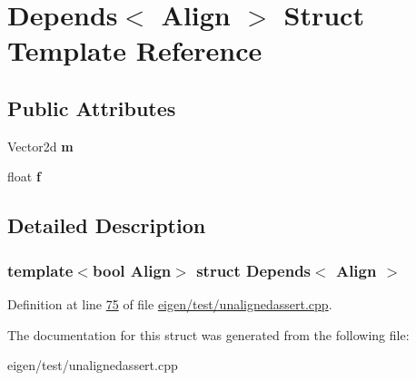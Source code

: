 \hypertarget{struct_depends}{}\section{Depends$<$ Align $>$ Struct Template Reference}
\label{struct_depends}
\subsection*{Public Attributes}
\begin{DoxyCompactItemize}
\item 
\mbox{\label{struct_depends_afef3e9e1fbdc59ed978880a8e432e96c}} 
Vector2d {\bfseries m}
\item 
\mbox{\label{struct_depends_ae26f683602bde42739e46c9c2677b2ef}} 
float {\bfseries f}
\end{DoxyCompactItemize}


\subsection{Detailed Description}
\subsubsection*{template$<$bool Align$>$\newline
struct Depends$<$ Align $>$}



Definition at line \hyperlink{eigen_2test_2unalignedassert_8cpp_source_l00075}{75} of file \hyperlink{eigen_2test_2unalignedassert_8cpp_source}{eigen/test/unalignedassert.\+cpp}.



The documentation for this struct was generated from the following file\+:\begin{DoxyCompactItemize}
\item 
eigen/test/unalignedassert.\+cpp\end{DoxyCompactItemize}
